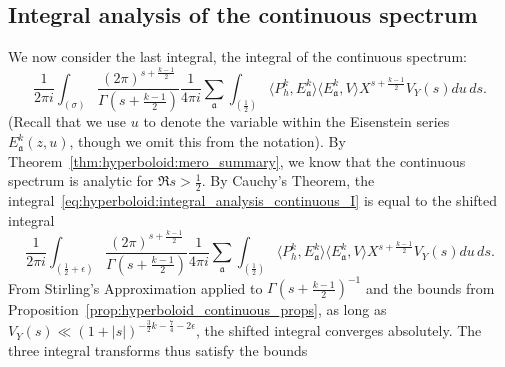 \subsection{Integral analysis of the continuous spectrum}


We now consider the last integral, the integral of the continuous spectrum:
\begin{equation}\label{eq:hyperboloid:integral_analysis_continuous_I}
  \frac{1}{2\pi i} \int_{(\sigma)} \frac{(2\pi)^{s + \frac{k-1}{2}}}{\Gamma(s +
  \frac{k-1}{2})} \frac{1}{4\pi i} \sum_{\mathfrak{a}} \int_{(\frac{1}{2})} \langle P_h^k,
  E_\mathfrak{a}^k\rangle \langle E_\mathfrak{a}^k, V\rangle X^{s+\frac{k-1}{2}} V_Y(s)
  du \, ds.
\end{equation}
(Recall that we use $u$ to denote the variable within the Eisenstein series
$E_\mathfrak{a}^k(z,u)$, though we omit this from the notation).
By Theorem~\ref{thm:hyperboloid:mero_summary}, we know that the continuous spectrum is
analytic for $\Re s > \frac{1}{2}$.
By Cauchy's Theorem, the integral~\eqref{eq:hyperboloid:integral_analysis_continuous_I}
is equal to the shifted integral
\begin{equation}
  \frac{1}{2\pi i} \int_{(\frac{1}{2} + \epsilon)} \frac{(2\pi)^{s +
  \frac{k-1}{2}}}{\Gamma(s + \frac{k-1}{2})} \frac{1}{4\pi i} \sum_{\mathfrak{a}}
  \int_{(\frac{1}{2})} \langle P_h^k, E_\mathfrak{a}^k\rangle \langle E_\mathfrak{a}^k,
  V\rangle X^{s+\frac{k-1}{2}} V_Y(s) du \, ds.
\end{equation}
From Stirling's Approximation applied to $\Gamma(s + \frac{k-1}{2})^{-1}$ and the bounds
from Proposition~\ref{prop:hyperboloid_continuous_props}, as long as $V_Y(s) \ll (1 +
\lvert s \rvert)^{-\frac{3}{2}k - \frac{7}{4} - 2\epsilon}$, the shifted integral
converges absolutely.
The three integral transforms thus satisfy the bounds
